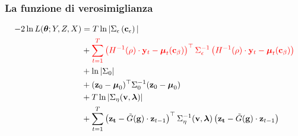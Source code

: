 \begin{frame}
	\frametitle{La funzione di verosimiglianza}
	
	\begin{equation*}
		\begin{split}
			-2\ln L(\boldsymbol{\theta}; Y, Z, X) & =  T\ln|\Sigma_\epsilon\left(\textcolor{black}{\mathbf{c}_\epsilon}\right)| \\
			& + \textcolor{red}{\sum_{t=1}^{T} \left(H^{-1}(\rho)\cdot\mathbf{y}_t - \boldsymbol{\mu}_t(\mathbf{c}_\beta)\right)^\top\Sigma_\epsilon^{-1}\left(H^{-1}(\rho)\cdot\mathbf{y}_t - \boldsymbol{\mu}_t(\mathbf{c}_\beta)\right)} \\
			& + \ln|\Sigma_0| \\
			& + (\mathbf{z}_0 - \boldsymbol{\mu}_0)^\top\Sigma_0^{-1}(\mathbf{z}_0 - \boldsymbol{\mu}_0) \\
			& + T\ln |\Sigma_\eta(\textcolor{black}{\mathbf{v},\boldsymbol{\lambda}})| \\
			& + \sum_{t=1}^{T}\left(\mathbf{z_t}-\tilde{G}(\textcolor{black}{\mathbf{g}})\cdot\mathbf{z}_{t-1}\right)^\top\Sigma_\eta^{-1}(\textcolor{black}{\mathbf{v},\boldsymbol{\lambda}})\left(\mathbf{z_t}-\tilde{G}(\textcolor{black}{\mathbf{g}})\cdot\mathbf{z}_{t-1}\right)
		\end{split}
		\label{eq_fin_verosimiglianza}
	\end{equation*}
	
\end{frame}